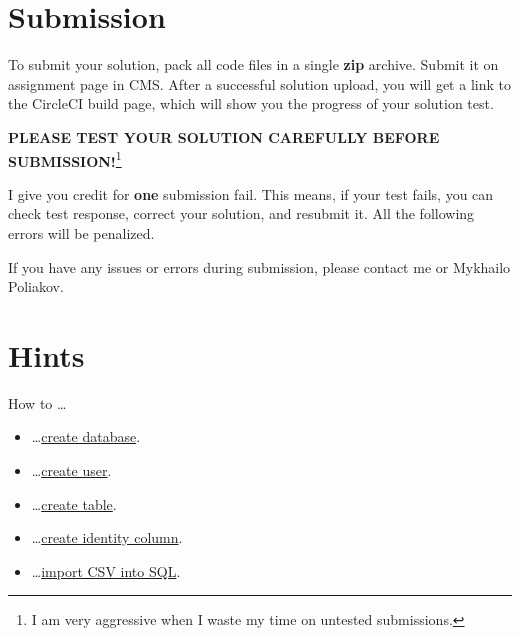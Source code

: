 \documentclass[12pt]{article}
\begin{document}
\section*{Submission}

To submit your solution, pack all code files in a single \textbf{zip} archive. Submit it on assignment page in CMS. After a successful solution upload, you will get a link to the CircleCI build page, which will show you the progress of your solution test.

\uppercase{\textbf{Please test your solution carefully before submission!}}\footnote{I am very aggressive when I waste my time on untested submissions.}

I give you credit for \textbf{one} submission fail. This means, if your test fails, you can check test response, correct your solution, and resubmit it. All the following errors will be penalized.

If you have any issues or errors during submission, please contact me or Mykhailo Poliakov.

\clearpage

\section*{Hints}
How to \dots
\begin{itemize}
\item \dots \href{https://dev.mysql.com/doc/refman/5.7/en/creating-database.html}{create database}.
\item \dots \href{https://www.digitalocean.com/community/tutorials/mysql-ru}{create user}.
\item \dots \href{https://dev.mysql.com/doc/refman/5.5/en/creating-tables.html}{create table}.
\item \dots \href{https://dev.mysql.com/doc/refman/5.7/en/example-auto-increment.html}{create identity column}.
\item \dots \href{https://dev.mysql.com/doc/refman/5.7/en/load-data.html}{import CSV into SQL}.

\end{itemize}
\end{document}
